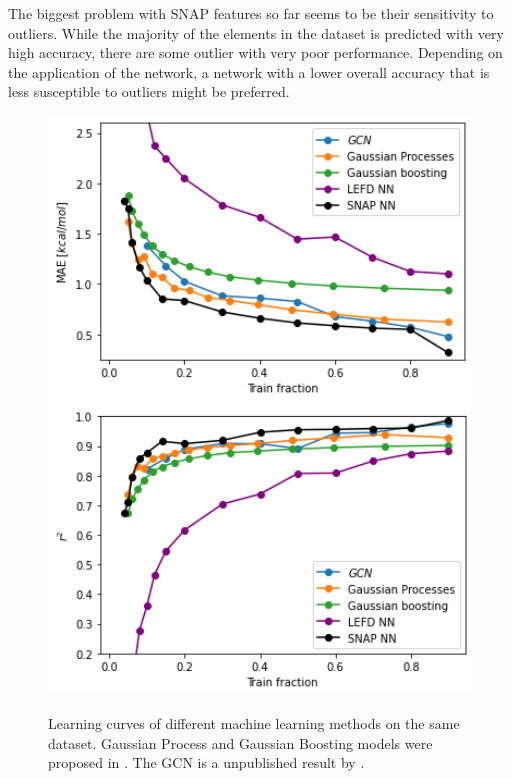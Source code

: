 The biggest problem with SNAP features so far seems to be their sensitivity to outliers.
While the majority of the elements in the dataset is predicted with very high accuracy, 
there are some outlier with very poor performance.
Depending on the application of the network, a network with a lower overall accuracy 
that is less susceptible to outliers might be preferred.

\begin{figure}[!htb]
    \includegraphics[width=1.0\textwidth]{figures/regression/mae-compare.png}
  \endminipage\hfill
  \includegraphics[width=1.0\textwidth]{figures/regression/r2-compare.png}
  \endminipage\hfill  
  \caption{
    Learning curves of different machine learning methods on the same dataset.
    Gaussian Process and Gaussian Boosting models were proposed in \cite{friederich_dos}.
    The GCN is a unpublished result by \citeauthor{friederich_dos}.
  }
  \label{fig:snap_roation}

\end{figure}



